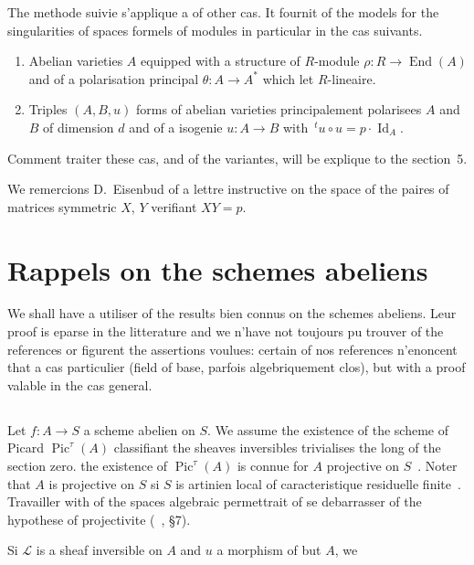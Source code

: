 \documentclass[11pt,a4paper]{article}
\theoremstyle{plain}
\theoremstyle{definition}
\DeclareMathOperator{\End}{End}
\DeclareMathOperator{\Pic}{Pic}
\begin{document}
The methode suivie s'applique a of other cas. It fournit of the models for the
singularities of spaces formels of modules in particular in the cas suivants.
\begin{enumerate}[label=(\roman*)]
\item Abelian varieties $A$ equipped with a structure of $R$-module $\rho: R \to \End(A)$
and of a polarisation principal $\theta: A \to A^*$ which let $R$-lineaire.
\item Triples $(A, B, u)$ forms of abelian varieties principalement polarisees $A$
and $B$ of dimension $d$ and of a isogenie $u: A \to B$ with $\,\!^t u \circ u = p \cdot \operatorname{Id}_A$.
\end{enumerate}
Comment traiter these cas, and of the variantes, will be explique to the section~5.

We remercions D.~Eisenbud of a lettre instructive on the space of the paires
of matrices symmetric $X$, $Y$ verifiant $XY = p$.

\section{Rappels on the schemes abeliens}

We shall have a utiliser of the results bien connus on the schemes abeliens. Leur
proof is eparse in the litterature and we n'have not toujours pu trouver
of the references or figurent the assertions voulues: certain of nos references
n'enoncent that a cas particulier (field of base, parfois algebriquement clos),
but with a proof valable in the cas general.

\subsection{}

Let $f: A \to S$ a scheme abelien on $S$. We assume the existence of the
scheme of Picard $\Pic^\tau(A)$ classifiant the sheaves inversibles trivialises the long
of the section zero. the existence of $\Pic^\tau(A)$ is connue for $A$ projective on $S$~\cite{FGA}.
Noter that $A$ is projective on $S$ si $S$ is artinien local of caracteristique
residuelle finite~\cite{Oort}. Travailler with of the spaces algebraic permettrait of se
debarrasser of the hypothese of projectivite (~\cite{Artin}, \S7).

Si $\mathscr{L}$ is a sheaf inversible on $A$ and $u$ a morphism of but $A$, we
\end{document}
